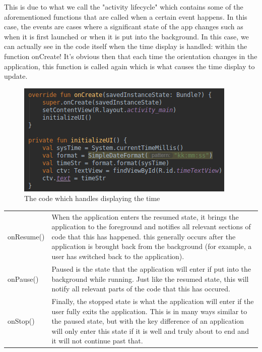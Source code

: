 \documentclass{scrartcl}
\begin{document}
\pagebreak

This is due to what we call the "activity lifecycle" which contains some of the aforementioned
functions that are called when a certain event happens. In this case, the events are cases where
a significant state of the app changes such as when it is first launched or when it is put into
the background. In this case, we can actually see in the code itself when the time display is
handled: within the function onCreate! It's obvious then that each time the orientation changes
in the application, this function is called again which is what causes the time display to
update.

\begin{figure}[h]
    \centering
    \includegraphics[scale=0.7]{images/code.png}
    \caption{The code which handles displaying the time}
\end{figure}

\begin{tabular}{p{2cm} p{11cm}}
    onResume() & When the application enters the resumed state, it brings the application to the
                 foreground and notifies all relevant sections of code that this has happened.
                 this generally occurs after the application is brought back from the background
                 (for example, a user has switched back to the application). \\[1em]
    onPause() & Paused is the state that the application will enter if put into the background
                while running. Just like the resumed state, this will notify all relevant 
                parts of the code that this has occured. \\[1em]
    onStop() & Finally, the stopped state is what the application will enter if the user fully
               exits the application. This is in many ways similar to the paused state, but with
               the key difference of an application will only enter this state if it is well and
               truly about to end and it will not continue past that. \\[1em]
\end{tabular}
\end{document}
